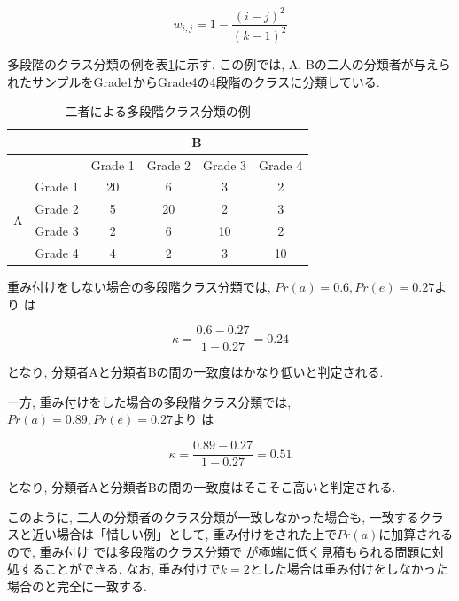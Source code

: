 \documentclass[12pt]{jarticle}
\begin{document}
\begin{equation}
w_{i, j} = 1 - \frac{(i - j)^2}{(k-1)^2}
\end{equation}

多段階のクラス分類の例を表\ref{classifi_4}に示す.
この例では, A, Bの二人の分類者が与えられたサンプルをGrade1からGrade4の4段階のクラスに分類している.

\begin{table}
\begin{center}
\caption{二者による多段階クラス分類の例}
\label{classifi_4}
\begin{tabular}[t]{|c|c|c|c|c|c|}
  \hline
  \multirow{2}{*}{} & & \multicolumn{4}{|c|}{B} \\ \hline
                            &   & Grade 1 & Grade 2 & Grade 3 & Grade 4 \\ \hline
  \multirow{4}{*}{A} & Grade 1  & 20 &  6 &  3 &  2   \\ \cline{2-6}
                     & Grade 2  &  5 & 20 &  2 &  3   \\ \cline{2-6}
                     & Grade 3  &  2 &  6 & 10 &  2   \\ \cline{2-6}
                     & Grade 4  &  4 &  2 &  3 &  10   \\ \hline
\end{tabular}
\end{center}
\end{table}

重み付けをしない場合の多段階クラス分類では, $Pr(a) = 0.6, Pr(e) = 0.27$より \kappac は

\begin{equation}
  \kappa = \frac{0.6 - 0.27}{1 - 0.27} = 0.24
\end{equation}

となり, 分類者Aと分類者Bの間の一致度はかなり低いと判定される.

一方, 重み付けをした場合の多段階クラス分類では, $Pr(a) = 0.89, Pr(e) = 0.27$より \kappac は

\begin{equation}
  \kappa = \frac{0.89 - 0.27}{1 - 0.27} = 0.51
\end{equation}

となり, 分類者Aと分類者Bの間の一致度はそこそこ高いと判定される.

このように, 二人の分類者のクラス分類が一致しなかった場合も, 一致するクラスと近い場合は「惜しい例」として, 重み付けをされた上で$Pr(a)$に加算されるので, 重み付け \kappac では多段階のクラス分類で \kappac が極端に低く見積もられる問題に対処することができる.
なお, 重み付け\kappac で$k=2$とした場合は重み付けをしなかった場合の\kappac と完全に一致する.
\end{document}
